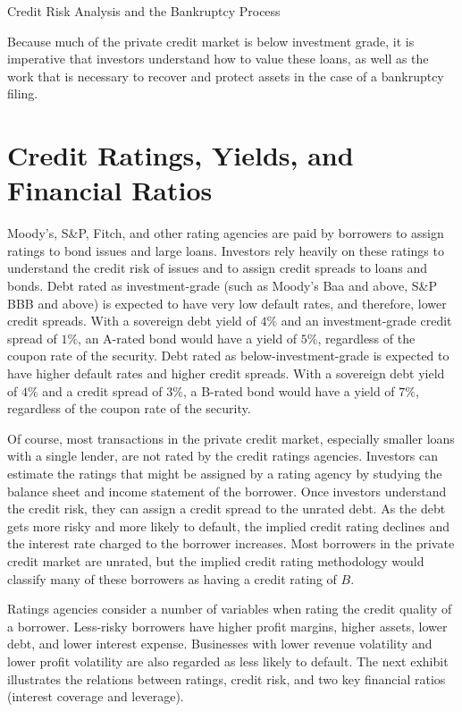 \documentclass[11pt]{article}
\begin{document}
Credit Risk Analysis and the Bankruptcy Process

Because much of the private credit market is below investment grade, it is imperative that investors understand how to value these loans, as well as the work that is necessary to recover and protect assets in the case of a bankruptcy filing.

\section*{Credit Ratings, Yields, and Financial Ratios}
Moody's, S\&P, Fitch, and other rating agencies are paid by borrowers to assign ratings to bond issues and large loans. Investors rely heavily on these ratings to understand the credit risk of issues and to assign credit spreads to loans and bonds. Debt rated as investment-grade (such as Moody's Baa and above, S\&P BBB and above) is expected to have very low default rates, and therefore, lower credit spreads. With a sovereign debt yield of $4 \%$ and an investment-grade credit spread of $1 \%$, an A-rated bond would have a yield of $5 \%$, regardless of the coupon rate of the security. Debt rated as below-investment-grade is expected to have higher default rates and higher credit spreads. With a sovereign debt yield of $4 \%$ and a credit spread of $3 \%$, a B-rated bond would have a yield of $7 \%$, regardless of the coupon rate of the security.

Of course, most transactions in the private credit market, especially smaller loans with a single lender, are not rated by the credit ratings agencies. Investors can estimate the ratings that might be assigned by a rating agency by studying the balance sheet and income statement of the borrower. Once investors understand the credit risk, they can assign a credit spread to the unrated debt. As the debt gets more risky and more likely to default, the implied credit rating declines and the interest rate charged to the borrower increases. Most borrowers in the private credit market are unrated, but the implied credit rating methodology would classify many of these borrowers as having a credit rating of $B$.

Ratings agencies consider a number of variables when rating the credit quality of a borrower. Less-risky borrowers have higher profit margins, higher assets, lower debt, and lower interest expense. Businesses with lower revenue volatility and lower profit volatility are also regarded as less likely to default. The next exhibit illustrates the relations between ratings, credit risk, and two key financial ratios (interest coverage and leverage).
\end{document}
